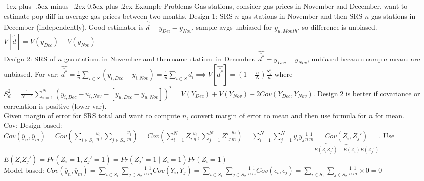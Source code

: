 \documentclass[10pt,landscape]{article}
\makeatletter
\renewcommand{\section}{\@startsection{section}{1}{0mm}%
                                {-1ex plus -.5ex minus -.2ex}%
                                {0.5ex plus .2ex}%
                                {\normalfont\large\bfseries}}
\makeatother
\begin{document}
\begin{multicols*}{3}
\section{Example Problems}
Gas stations, consider gas prices in November and December, want to
estimate pop diff in average gas prices between two months. Design 1:
SRS $n$ gas stations in November and then SRS $n$ gas stations in
December (independently). Good estimator is $\hat{\overline{d}} =
\overline{y}_{Dec} - \overline{y}_{Nov}$, sample avgs unbiased for
$\overline{y}_{u,Month}$. so difference is
unbiased. $V[\hat{\overline{d}}] = V(\overline{y}_{Dec}) +
V(\overline{y}_{Nov})$
\\ Design 2: SRS of $n$ gas stations in November and then same
stations in December. $\hat{\overline{d^*}} = \overline{y}_{Dec} -
\overline{y}_{Nov}$, unbiased because sample means are unbiased. For
var: $\hat{\overline{d^*}} = \frac{1}{n} \sum_{i \in S} (y_{i, Dec} -
y_{i, Nov}) = \frac{1}{n} \sum_{i \in S} d_i \implies
V[\hat{\overline{d^*}}] = \left(1 - \frac{n}{N}\right)\frac{S_d^2}{n}$
where $S_d^2 = \frac{1}{N-1} \sum_{i=1}^N (y_{i,Dec} - u_{i,Nov} -
[\overline{y}_{u,Dec} - \overline{y}_{u, Nov}])^2 = V(Y_{Dec}) +
V(Y_{Nov}) - 2Cov(Y_{Dec}, Y_{Nov})$. Design 2 is better if covariance
or correlation is positive (lower var).
\\ Given margin of error for SRS total and want to compute $n$,
convert margin of error to mean and then use formula for $n$ for mean.
\\ Cov: Design based: $Cov(\overline{y}_n, \overline{y}_m) = Cov
\left(\sum_{i \in S_1} \frac{y_i}{n}, \sum_{j\in S_2}
  \frac{y_j}{m}\right) = Cov \left(\sum_{i=1}^N Z_i \frac{y_i}{n},
  \sum_{j=1}^N Z'_j \frac{y_j}{m}\right) = \sum_{i=1}^N \sum_{j=1}^N
y_i y_j \frac{1}{n} \frac{1}{m} \underbrace{Cov (Z_i,
  Z_j')}_{E(Z_iZ_j') - E(Z_i)E(Z_j')}$. Use $E(Z_i Z_j') = Pr(Z_i = 1,
Z_j'=1) = Pr(Z_j' = 1 \mid Z_i = 1)Pr(Z_i = 1)$
\\ Model based: $Cov(\overline{y}_n, \overline{y}_m) = \sum_{i \in
  S_1} \sum_{j \in S_2} \frac{1}{n} \frac{1}{m} Cov (Y_i, Y_j) =
\sum_{i \in S_1} \sum_{j \in S_2} \frac{1}{n} \frac{1}{m}
Cov(\epsilon_i, \epsilon_j) = \sum_{i \in S_1} \sum_{j\in S_2}
\frac{1}{n} \frac{1}{m} \times 0 = 0$
\end{multicols*}
\end{document}
